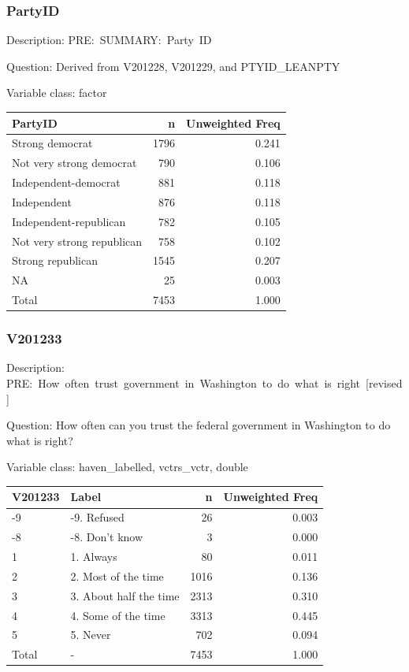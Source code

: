 \documentclass[
]{krantz}
\begin{document}
\hypertarget{partyid}{%
\subsubsection*{PartyID}\label{partyid}}


Description: PRE:~SUMMARY:~Party~ID

Question: Derived from V201228, V201229, and PTYID\_LEANPTY

Variable class: factor

\begin{tabular}[t]{l|r|r}
\hline
PartyID & n & Unweighted Freq\\
\hline
Strong democrat & 1796 & 0.241\\
\hline
Not very strong democrat & 790 & 0.106\\
\hline
Independent-democrat & 881 & 0.118\\
\hline
Independent & 876 & 0.118\\
\hline
Independent-republican & 782 & 0.105\\
\hline
Not very strong republican & 758 & 0.102\\
\hline
Strong republican & 1545 & 0.207\\
\hline
NA & 25 & 0.003\\
\hline
Total & 7453 & 1.000\\
\hline
\end{tabular}

\hypertarget{v201233}{%
\subsubsection*{V201233}\label{v201233}}


Description: PRE:~How~often~trust~government~in~Washington~to~do~what~is~right~{[}revised{]}

Question: How often can you trust the federal government in Washington to do what is right?

Variable class: haven\_labelled, vctrs\_vctr, double

\begin{tabular}[t]{l|l|r|r}
\hline
V201233 & Label & n & Unweighted Freq\\
\hline
-9 & -9. Refused & 26 & 0.003\\
\hline
-8 & -8. Don't know & 3 & 0.000\\
\hline
1 & 1. Always & 80 & 0.011\\
\hline
2 & 2. Most of the time & 1016 & 0.136\\
\hline
3 & 3. About half the time & 2313 & 0.310\\
\hline
4 & 4. Some of the time & 3313 & 0.445\\
\hline
5 & 5. Never & 702 & 0.094\\
\hline
Total & - & 7453 & 1.000\\
\hline
\end{tabular}
\end{document}
